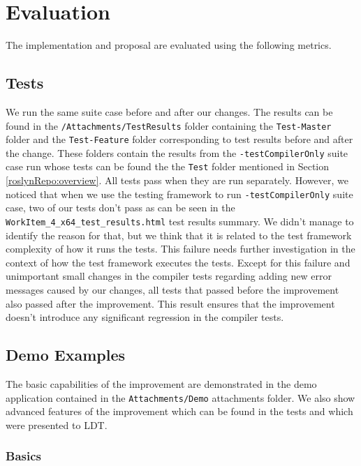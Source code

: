\chapter{Evaluation}

The implementation and proposal are evaluated using the following metrics.

\section{Tests}

We run the same suite case before and after our changes. 
The results can be found in the \texttt{/Attachments/TestResults} folder containing the \texttt{Test-Master} folder and the \texttt{Test-Feature} folder corresponding to test results before and after the change. 
These folders contain the results from the \texttt{-testCompilerOnly} suite case run whose tests can be found the the \texttt{Test} folder mentioned in Section \ref{roslynRepo:overview}.
All tests pass when they are run separately.
However, we noticed that when we use the testing framework to run \texttt{-testCompilerOnly} suite case, two of our tests don't pass as can be seen in the \texttt{WorkItem\_4\_x64\_test\_results.html} test results summary.
We didn't manage to identify the reason for that, but we think that it is related to the test framework complexity of how it runs the tests.
This failure needs further investigation in the context of how the test framework executes the tests.
Except for this failure and unimportant small changes in the compiler tests regarding adding new error messages caused by our changes, all tests that passed before the improvement also passed after the improvement.
This result ensures that the improvement doesn’t introduce any significant regression in the compiler tests.

\section{Demo Examples}

The basic capabilities of the improvement are demonstrated in the demo application contained in the \texttt{Attachments/Demo} attachments folder. 
We also show advanced features of the improvement which can be found in the tests and which were presented to LDT. 


\subsection{Basics}

